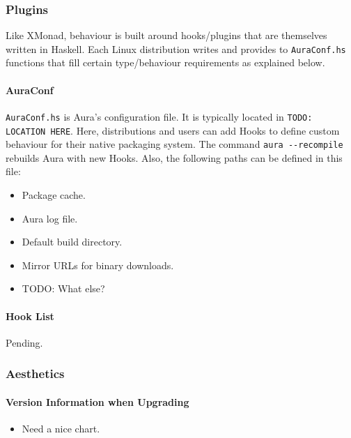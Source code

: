 \documentclass{article}
\begin{document}
\subsubsection{Plugins}\label{plugins}

Like XMonad, behaviour is built around hooks/plugins that are themselves
written in Haskell. Each Linux distribution writes and provides to
\texttt{AuraConf.hs} functions that fill certain type/behaviour
requirements as explained below.

\paragraph{AuraConf}\label{auraconf}

\texttt{AuraConf.hs} is Aura's configuration file. It is typically
located in \texttt{TODO: LOCATION HERE}. Here, distributions and users
can add Hooks to define custom behaviour for their native packaging
system. The command \texttt{aura -\/-recompile} rebuilds Aura with new
Hooks. Also, the following paths can be defined in this file:

\begin{itemize}
\itemsep1pt\parskip0pt
\item
  Package cache.
\item
  Aura log file.
\item
  Default build directory.
\item
  Mirror URLs for binary downloads.
\item
  TODO: What else?
\end{itemize}

\paragraph{Hook List}\label{hook-list}

Pending.

\subsubsection{Aesthetics}\label{aesthetics}

\paragraph{Version Information when
Upgrading}\label{version-information-when-upgrading}

\begin{itemize}
\itemsep1pt\parskip0pt
\item
  Need a nice chart.
\end{itemize}
\end{document}
